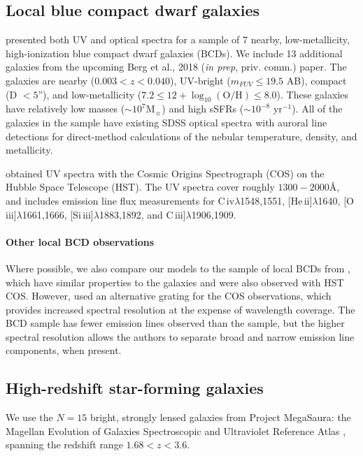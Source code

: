 \documentclass[preprint2]{aastex62}
\newcommand{\oiii}{[O\,{\sc iii}]\xspace}
\newcommand{\heii}{[He\,{\sc ii}]\xspace}
\newcommand{\civ}{C\,{\sc iv}\xspace}
\newcommand{\SiuIII}{[Si\,{\sc iii}]\xspace}
\newcommand{\ciii}{C\,{\sc iii}]\xspace}
\newcommand\Msun{\ensuremath{\mathrm{M_{\sun}}}\xspace}
\newcommand{\logten}{\ensuremath{\log_{10}}}
\newcommand{\logOH}{\ensuremath{\logten (\mathrm{O}/\mathrm{H})}\xspace}
\newcommand{\ang}{\ensuremath{\mbox{\AA}}\xspace}
\newcommand{\mage}{{\sc Meg}a{\sc S}a{\sc ura}\xspace}
\begin{document}
\subsection{Local blue compact dwarf galaxies}\label{sec:data:BCDs}

\citet{Berg+2016} presented both UV and optical spectra for a sample of 7 nearby, low-metallicity, high-ionization blue compact dwarf galaxies (BCDs). We include 13 additional galaxies from the upcoming Berg et al., 2018 (\emph{in prep}, priv. comm.) paper. The galaxies are nearby ($0.003 < z < 0.040$), UV-bright ($m_{FUV} \leq 19.5$ AB), compact (D $< 5$''), and low-metallicity ($7.2 \leq 12 + \logOH \leq 8.0$). These galaxies have relatively low masses (${\sim}10^7$\Msun) and high sSFRs (${\sim}10^{-8}$ yr$^{-1}$). All of the galaxies in the sample have existing SDSS optical spectra with auroral line detections for direct-method calculations of the nebular temperature, density, and metallicity.

\citet{Berg+2016} obtained UV spectra with the Cosmic Origins Spectrograph (COS) on the Hubble Space Telescope (HST). The UV spectra cover roughly $1300-2000$\ang, and \citet{Berg+2016} includes emission line flux measurements for \civ$\lambda$1548,1551, \heii$\lambda$1640, \oiii$\lambda$1661,1666, \SiuIII$\lambda$1883,1892, and \ciii$\lambda$1906,1909.

\paragraph{Other local BCD observations} Where possible, we also compare our models to the sample of local BCDs from \citet{Senchyna+2017}, which have similar properties to the \citet{Berg+2016} galaxies and were also observed with HST COS. However, \citet{Senchyna+2017} used an alternative grating for the COS observations, which provides increased spectral resolution at the expense of wavelength coverage. The \citet{Senchyna+2017} BCD sample has fewer emission lines observed than the \citet{Berg+2016} sample, but the higher spectral resolution allows the authors to separate broad and narrow emission line components, when present.

\subsection{High-redshift star-forming galaxies}\label{sec:data:mage}

We use the $N = 15$ bright, strongly lensed galaxies from Project \mage: the Magellan Evolution of Galaxies Spectroscopic and Ultraviolet Reference Atlas \citep{Rigby+2018a, Rigby+2018b}, spanning the redshift range $1.68 < z < 3.6$.
\end{document}
